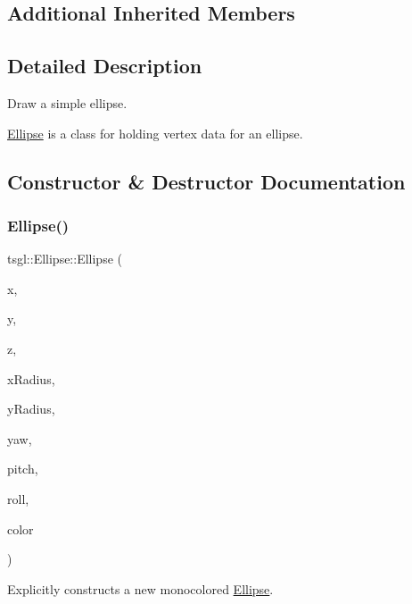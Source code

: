 \subsection*{Additional Inherited Members}


\subsection{Detailed Description}
Draw a simple ellipse. 

\hyperlink{classtsgl_1_1_ellipse}{Ellipse} is a class for holding vertex data for an ellipse. 

\subsection{Constructor \& Destructor Documentation}
\mbox{\label{classtsgl_1_1_ellipse_a659436dbb6b37e117cbe98c3c7b23599}} 
\subsubsection{\texorpdfstring{Ellipse()}{Ellipse()}\hspace{0.1cm}{\footnotesize\ttfamily [1/2]}}
{\footnotesize\ttfamily tsgl\+::\+Ellipse\+::\+Ellipse (\begin{DoxyParamCaption}\item[{float}]{x,  }\item[{float}]{y,  }\item[{float}]{z,  }\item[{G\+Lfloat}]{x\+Radius,  }\item[{G\+Lfloat}]{y\+Radius,  }\item[{float}]{yaw,  }\item[{float}]{pitch,  }\item[{float}]{roll,  }\item[{\hyperlink{structtsgl_1_1_color_float}{Color\+Float}}]{color }\end{DoxyParamCaption})}



Explicitly constructs a new monocolored \hyperlink{classtsgl_1_1_ellipse}{Ellipse}. 

